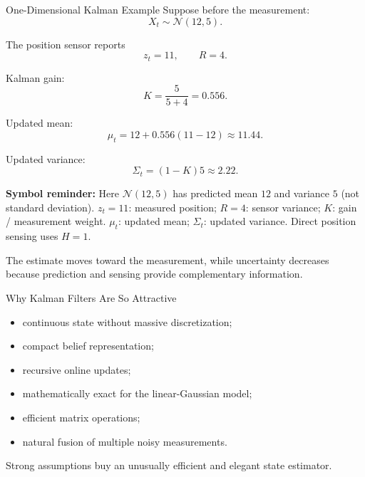 \documentclass[aspectratio=169,10pt]{beamer}
\newcommand{\equationlegend}[1]{%
  \par\smallskip
  \begingroup
    \setlength{\fboxsep}{5pt}%
    \noindent\colorbox{DeckSoft}{%
      \parbox{\dimexpr\linewidth-2\fboxsep\relax}{%
        \footnotesize\textbf{Symbol reminder:} #1%
      }%
    }\par
  \endgroup
  \smallskip
}
\begin{document}
\begin{frame}[shrink=10]{One-Dimensional Kalman Example}
  \setlength{\abovedisplayskip}{3pt}
  \setlength{\belowdisplayskip}{3pt}
  \setlength{\abovedisplayshortskip}{3pt}
  \setlength{\belowdisplayshortskip}{3pt}
  Suppose before the measurement:
  \[
    X_t\sim\mathcal{N}(12,5).
  \]

  The position sensor reports
  \[
    z_t=11,
    \qquad R=4.
  \]

  Kalman gain:
  \[
    K=\frac{5}{5+4}=0.556.
  \]

  Updated mean:
  \[
    \mu_t=12+0.556(11-12)\approx11.44.
  \]

  Updated variance:
  \[
    \Sigma_t=(1-K)5\approx2.22.
  \]

  \equationlegend{Here $\mathcal{N}(12,5)$ has predicted mean $12$ and variance $5$ (not standard deviation). $z_t=11$: measured position; $R=4$: sensor variance; $K$: gain / measurement weight. $\mu_t$: updated mean; $\Sigma_t$: updated variance. Direct position sensing uses $H=1$.}

  \begin{keyidea}
    The estimate moves toward the measurement, while uncertainty decreases because prediction and sensing provide complementary information.
  \end{keyidea}
\end{frame}

\begin{frame}[shrink=10]{Why Kalman Filters Are So Attractive}
  \begin{itemize}
    \item continuous state without massive discretization;
    \item compact belief representation;
    \item recursive online updates;
    \item mathematically exact for the linear-Gaussian model;
    \item efficient matrix operations;
    \item natural fusion of multiple noisy measurements.
  \end{itemize}

  \begin{keyidea}
    Strong assumptions buy an unusually efficient and elegant state estimator.
  \end{keyidea}
\end{frame}
\end{document}
